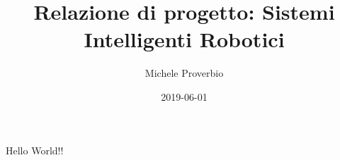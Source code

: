\documentclass{article}
\title{Relazione di progetto: Sistemi Intelligenti Robotici}
\date{2019-06-01}
\author{Michele Proverbio}
\begin{document}
	\maketitle
	\newpage
	
	Hello World!!
\end{document}
